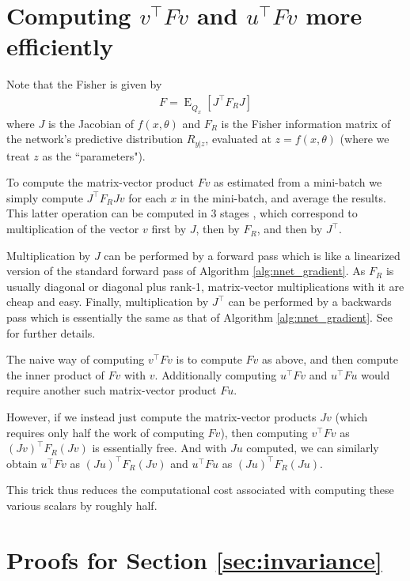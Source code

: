 \documentclass[12pt]{article}
\newcommand{\expected}{\operatorname{E}}
\begin{document}
\section{Computing $v^\top F v$ and $u^\top F v$ more efficiently}
\label{sec:cheap_uFv}

Note that the Fisher is given by
\begin{align*}
F = \expected_{\hat{Q}_x} \left[ J^\top F_R J \right]
\end{align*}
where $J$ is the Jacobian of $f(x,\theta)$ and $F_R$ is the Fisher information matrix of the network's predictive distribution $R_{y|z}$, evaluated at $z = f(x,\theta)$ (where we treat $z$ as the ``parameters"). 

To compute the matrix-vector product $Fv$ as estimated from a mini-batch we simply compute $J^\top F_R J v$ for each $x$ in the mini-batch, and average the results.  This latter operation can be computed in 3 stages \citep[e.g.][]{ng_martens}, which correspond to multiplication of the vector $v$ first by $J$, then by $F_R$, and then by $J^\top$.  

Multiplication by $J$ can be performed by a forward pass which is like a linearized version of the standard forward pass of Algorithm \ref{alg:nnet_gradient}.  As $F_R$ is usually diagonal or diagonal plus rank-1, matrix-vector multiplications with it are cheap and easy.  Finally, multiplication by $J^\top$ can be performed by a backwards pass which is essentially the same as that of Algorithm \ref{alg:nnet_gradient}. See \citet{schraudolph, ng_martens} for further details.

The naive way of computing $v^\top F v$ is to compute $Fv$ as above, and then compute the inner product of $Fv$ with $v$.   Additionally computing $u^\top F v$ and $u^\top F u$ would require another such matrix-vector product $F u$. 

However, if we instead just compute the matrix-vector products $J v$ (which requires only half the work of computing $Fv$), then computing $v^\top F v$ as $(J v)^\top F_R (J v)$ is essentially free.  And with $J u$ computed, we can similarly obtain $u^\top F v$ as $(J u)^\top F_R (J v)$ and $u^\top F u$ as $(J u)^\top F_R (J u)$. 

This trick thus reduces the computational cost associated with computing these various scalars by roughly half.



\section{Proofs for Section \ref{sec:invariance}}
\end{document}
